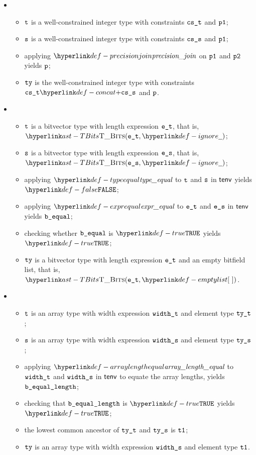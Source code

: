 \begin{itemize}
\begin{itemize}
\begin{itemize}
      \item {}
      \begin{itemize}
        \item $\texttt{t}$ is a well-constrained integer type with constraints $\texttt{cs\_t}$ and \Proseprecisionlossindicator{} $\texttt{p1}$;
        \item $\texttt{s}$ is a well-constrained integer type with constraints $\texttt{cs\_s}$ and \Proseprecisionlossindicator{} $\texttt{p1}$;
        \item applying $\precisionjoin$ on $\texttt{p1}$ and $\texttt{p2}$ yields $\texttt{p}$;
        \item $\texttt{ty}$ is the well-constrained integer type with constraints $\cst \concat \css$ and \Proseprecisionlossindicator{} $\texttt{p}$.
      \end{itemize}

      \item {}
      \begin{itemize}
        \item $\texttt{t}$ is a bitvector type with length expression $\texttt{e\_t}$, that is, $\TBits(\vet, \Ignore)$;
        \item $\texttt{s}$ is a bitvector type with length expression $\texttt{e\_s}$, that is, $\TBits(\ves, \Ignore)$;
        \item applying $\typeequal$ to $\texttt{t}$ and $\texttt{s}$ in $\textsf{tenv}$ yields $\False$;
        \item applying $\exprequal$ to $\texttt{e\_t}$ and $\texttt{e\_s}$ in $\textsf{tenv}$ yields $\texttt{b\_equal}$;
        \item checking whether $\texttt{b\_equal}$ is $\True$ yields $\True$\ProseTerminateAs{\NoLCA};
        \item $\texttt{ty}$ is a bitvector type with length expression $\texttt{e\_t}$ and an empty bitfield list, that is, $\TBits(\vet, \emptylist)$.
      \end{itemize}

      \item {}
      \begin{itemize}
        \item $\texttt{t}$ is an array type with width expression $\texttt{width\_t}$ and element type $\texttt{ty\_t}$;
        \item $\texttt{s}$ is an array type with width expression $\texttt{width\_s}$ and element type $\texttt{ty\_s}$;
        \item applying $\arraylengthequal$ to $\texttt{width\_t}$ and $\texttt{width\_s}$ in $\textsf{tenv}$ to equate the array lengths,
              yields $\texttt{b\_equal\_length}$\ProseOrTypeError;
        \item checking that $\texttt{b\_equal\_length}$ is $\True$ yields $\True$\ProseTerminateAs{\NoLCA};
        \item the lowest common ancestor of $\texttt{ty\_t}$ and $\texttt{ty\_s}$ is $\texttt{t1}$\ProseOrTypeError;
        \item $\texttt{ty}$ is an array type with width expression $\texttt{width\_s}$ and element type $\texttt{t1}$.
      \end{itemize}


\end{itemize}
\end{itemize}
\end{itemize}
